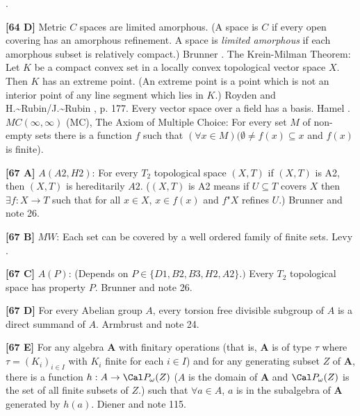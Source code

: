 \cite{1984b}.
\smallskip
\item{}{\bf [64 D]} Metric $C$ spaces are limited amorphous. (A space
is $C$ if every open covering has an amorphous refinement. A space
is {\it limited amorphous} if each amorphous subset is relatively
compact.)  \ac{Brunner} \cite{1984b}.
\medskip
{} The Krein-Milman Theorem: Let $K$ be a compact
convex set in a locally convex topological vector space $X$. Then $K$
has an extreme point. (An extreme point is a point which is not an
interior point of any line segment which lies in  $K$.)
\ac{Royden} \cite{1963} and \ac{H.~Rubin/J.~Rubin} \cite{1985}, p. 177.
\medskip
{} Every vector space over a field has a basis. \ac{Hamel}
\cite{1905}.
\medskip
{} $MC(\infty,\infty)$ (MC), The Axiom of Multiple
Choice: For every set $M$ of non-empty sets there is a function $f$ such
that $(\forall x\in M)(\emptyset\neq f(x)\subseteq x$ and $f(x)$ is finite).
\smallskip
\item{}{\bf [67 A]} $A(A2,H2)$:  For every $T_2$ topological space $(X,T)$
if $(X,T)$ is A2, then $(X,T)$ is hereditarily $A2$. ($(X,T)$ is A2 means
if $U\subseteq T$ covers $X$ then $\exists f:X\rightarrow T$ such that
for all $x\in X$, $x\in f(x)$ and $f$"$X$ refines $U$.)
\ac{Brunner} \cite{1983d} and note 26.
\smallskip
\item{}{\bf [67 B]} $MW$:  Each set can be covered by a well ordered
family of finite sets.  \ac{Levy} \cite{1962}.
\smallskip
\item{}{\bf [67 C]} $A(P)$: (Depends on $P\in\{D1,B2,B3,H2,A2\}.)$
Every $T_2$ topological space has property $P$.  \ac{Brunner} \cite{1983d}
and note 26.
\smallskip
\item{}{\bf [67 D]}  For every Abelian group $A$, every torsion free
divisible subgroup of $A$ is a direct summand of $A$.  \ac{Armbrust}
\cite{1972} and note 24.
\smallskip
\item{}{\bf [67 E]} For any algebra {\bf A} with finitary operations
(that is, {\bf A} is of type $\tau$ where $\tau = (K_i)_{i\in I}$ with
$K_i$ finite for each $i\in I$) and for any generating subset $Z$ of
{\bf A}, there is a function $h: A\to \Cal P_\omega(Z)$ ($A$ is the
domain of {\bf A} and $\Cal P_\omega(Z)$ is the set of all finite
subsets of $Z$.) such that $\forall a\in A$, $a$ is in the
subalgebra of {\bf A} generated by $h(a)$.  \ac{Diener} \cite{1989} and
note 115.
\smallskip
